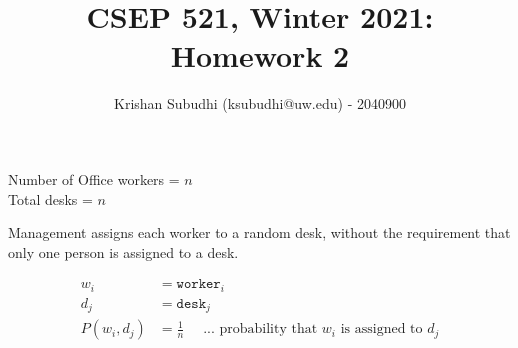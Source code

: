 \documentclass{homeworg}
\title{CSEP 521, Winter 2021: Homework 2}
\author{Krishan Subudhi (ksubudhi@uw.edu) - 2040900}
\begin{document}
\maketitle

\exercise
Number of Office workers = $n$\\
Total desks = $n$

Management assigns each worker to a random desk, without the requirement that only one person is assigned to a desk.

\begin{align*}
w_i &= \texttt{worker}_i \\
d_j &= \texttt{desk}_j \\
P(w_i, d_j) &= \frac{1}{n} \quad \text{ ... probability that $w_i$ is assigned to $d_j$}
\end{align*}
\end{document}
